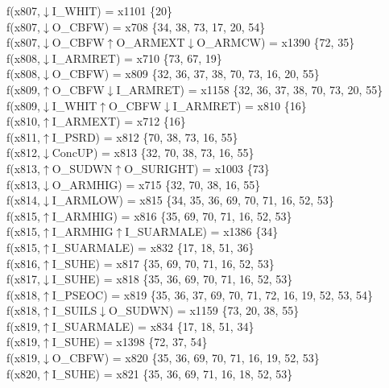 f(x807,$\downarrow$I\_WHIT) = x1101 \{20\} \\  
f(x807,$\downarrow$O\_CBFW) = x708 \{34, 38, 73, 17, 20, 54\} \\  
f(x807,$\downarrow$O\_CBFW$\uparrow$O\_ARMEXT$\downarrow$O\_ARMCW) = x1390 \{72, 35\} \\  
f(x808,$\downarrow$I\_ARMRET) = x710 \{73, 67, 19\} \\  
f(x808,$\downarrow$O\_CBFW) = x809 \{32, 36, 37, 38, 70, 73, 16, 20, 55\} \\  
f(x809,$\uparrow$O\_CBFW$\downarrow$I\_ARMRET) = x1158 \{32, 36, 37, 38, 70, 73, 20, 55\} \\  
f(x809,$\downarrow$I\_WHIT$\uparrow$O\_CBFW$\downarrow$I\_ARMRET) = x810 \{16\} \\  
f(x810,$\uparrow$I\_ARMEXT) = x712 \{16\} \\  
f(x811,$\uparrow$I\_PSRD) = x812 \{70, 38, 73, 16, 55\} \\  
f(x812,$\downarrow$ConcUP) = x813 \{32, 70, 38, 73, 16, 55\} \\  
f(x813,$\uparrow$O\_SUDWN$\uparrow$O\_SURIGHT) = x1003 \{73\} \\  
f(x813,$\downarrow$O\_ARMHIG) = x715 \{32, 70, 38, 16, 55\} \\  
f(x814,$\downarrow$I\_ARMLOW) = x815 \{34, 35, 36, 69, 70, 71, 16, 52, 53\} \\  
f(x815,$\uparrow$I\_ARMHIG) = x816 \{35, 69, 70, 71, 16, 52, 53\} \\  
f(x815,$\uparrow$I\_ARMHIG$\uparrow$I\_SUARMALE) = x1386 \{34\} \\  
f(x815,$\uparrow$I\_SUARMALE) = x832 \{17, 18, 51, 36\} \\  
f(x816,$\uparrow$I\_SUHE) = x817 \{35, 69, 70, 71, 16, 52, 53\} \\  
f(x817,$\downarrow$I\_SUHE) = x818 \{35, 36, 69, 70, 71, 16, 52, 53\} \\  
f(x818,$\uparrow$I\_PSEOC) = x819 \{35, 36, 37, 69, 70, 71, 72, 16, 19, 52, 53, 54\} \\  
f(x818,$\uparrow$I\_SUILS$\downarrow$O\_SUDWN) = x1159 \{73, 20, 38, 55\} \\  
f(x819,$\uparrow$I\_SUARMALE) = x834 \{17, 18, 51, 34\} \\  
f(x819,$\uparrow$I\_SUHE) = x1398 \{72, 37, 54\} \\  
f(x819,$\downarrow$O\_CBFW) = x820 \{35, 36, 69, 70, 71, 16, 19, 52, 53\} \\  
f(x820,$\uparrow$I\_SUHE) = x821 \{35, 36, 69, 71, 16, 18, 52, 53\} \\  
